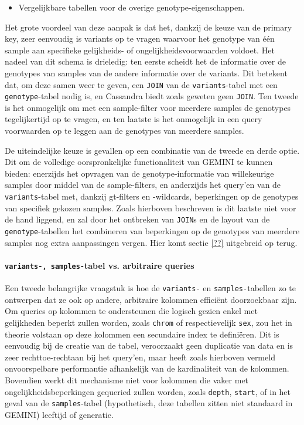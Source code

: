 \begin{itemize}
\begin{itemize}
\item Vergelijkbare tabellen voor de overige genotype-eigenschappen.

\end{itemize}

Het grote voordeel van deze aanpak is dat het, dankzij de keuze van de primary key, zeer eenvoudig is variants op te vragen waarvoor het genotype van \'e\'en sample aan specifieke gelijkheids- of ongelijkheidsvoorwaarden voldoet. Het nadeel van dit schema is drieledig: ten eerste scheidt het de informatie over de genotypes van samples van de andere informatie over de variants. Dit betekent dat, om deze samen weer te geven, een \texttt{JOIN} van de \texttt{variants}-tabel met een \texttt{genotype}-tabel nodig is, en Cassandra biedt zoals geweten geen \texttt{JOIN}. Ten tweede is het onmogelijk om met een sample-filter voor meerdere samples de genotypes tegelijkertijd op te vragen, en ten laatste is het onmogelijk in een query voorwaarden op te leggen aan de genotypes van meerdere samples.


\end{itemize}

De uiteindelijke keuze is gevallen op een combinatie van de tweede en derde optie. Dit om de volledige oorspronkelijke functionaliteit van GEMINI te kunnen bieden: enerzijds het opvragen van de genotype-informatie van willekeurige samples door middel van de sample-filters, en anderzijds het query'en van de \texttt{variants}-tabel met, dankzij gt-filters en -wildcards, beperkingen op de genotypes van specifiek gekozen samples. Zoals hierboven beschreven is dit laatste niet voor de hand liggend, en zal door het ontbreken van \texttt{JOIN}s en de layout van de \texttt{genotype}-tabellen het combineren van beperkingen op de genotypes van meerdere samples nog extra aanpassingen vergen. Hier komt sectie \ref{??} uitgebreid op terug.

\paragraph{\texttt{variants-, samples-}tabel vs. arbitraire queries}

Een tweede belangrijke vraagstuk is hoe de \texttt{variants-} en \texttt{samples-}tabellen zo te ontwerpen dat ze ook op andere, arbitraire kolommen effici\"ent doorzoekbaar zijn.\\
Om queries op kolommen te ondersteunen die logisch gezien enkel met gelijkheden beperkt zullen worden, zoals \texttt{chrom} of respectievelijk \texttt{sex}, zou het in theorie volstaan op deze kolommen een secundaire index te defini\"eren. Dit is eenvoudig bij de creatie van de tabel, veroorzaakt geen duplicatie van data en is zeer rechttoe-rechtaan bij het query'en, maar heeft zoals hierboven vermeld onvoorspelbare performantie afhankelijk van de kardinaliteit van de kolommen. Bovendien werkt dit mechanisme niet voor kolommen die vaker met ongelijkheidsbeperkingen gequeried zullen worden, zoals \texttt{depth}, \texttt{start}, of in het geval van de \texttt{samples}-tabel (hypothetisch, deze tabellen zitten niet standaard in GEMINI) leeftijd of generatie.\\

